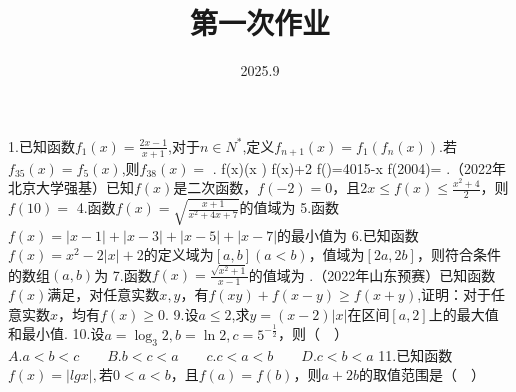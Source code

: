 \documentclass{article}
\title{第一次作业}
\date{2025.9}
\begin{document}
\maketitle

1.已知函数$f_1(x) = \frac{2x-1}{x+1}$,对于$n \in N^*$,定义$f_{n+1}(x) = f_1(f_n(x))$.若$f_{35}(x) = f_5(x)$,则$f_{38}(x) = $\newline
{}.   f(x)(x )  f(x)+2 f\left(\right)=4015-x  f(2004)=\newline
{}.（2022年北京大学强基）已知$f(x)$是二次函数，$f(-2) = 0$，且$2x \leq f(x) \leq \frac{x^2+4}{2}$，则$f(10) = $\newline
\newline
4.函数$f(x) = \sqrt{\frac{x+1}{x^2+4x+7}}$的值域为\newline
\newline
5.函数$f(x) = |x-1| + |x-3| + |x-5| + |x-7|$的最小值为\newline
\newline
6.已知函数$f(x) = x^2 - 2|x| + 2$的定义域为$[a,b](a<b)$，值域为$[2a,2b]$，则符合条件的数组$(a,b)$为\newline
\newline
7.函数$f(x) = \frac{\sqrt{x^2+1}}{x-1}$的值域为\newline
{}.（2022年山东预赛）已知函数$f(x)$满足，对任意实数$x,y$，有$f(xy) + f(x-y) \geq f(x+y)$,证明：对于任意实数$x$，均有$f(x) \geq 0$.\newline
\newline
\newline
\newline
\newline
\newline
9.设$a \leq 2$,求$y = (x-2)|x|$在区间$[a,2]$上的最大值和最小值.\newline
\newline
\newline
\newline
\newline
\newline
10.设$a = \log_{3}2, b = \ln2, c = 5^{-\frac{1}{2}}$，则（$\quad$）\newline
$A.a<b<c \qquad B.b<c<a \qquad c.c<a<b \qquad D.c<b<a$ \newline
\newline
11.已知函数$f(x) = |lgx|,$若$0<a<b$，且$f(a) = f(b)$，则$a+2b$的取值范围是（$\quad$）\newline
\end{document}
